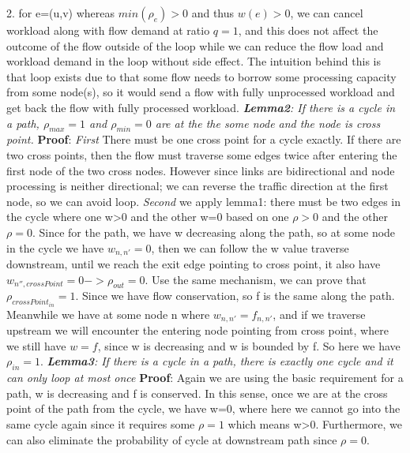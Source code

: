 \documentclass{sig-alternate}
\begin{document}
2. for e=(u,v) whereas $min(\rho_{e})>0$ and thus $w(e) > 0$, we can cancel workload along with flow demand at ratio $q=1$, and this does not affect the outcome of the flow outside of the loop while we can reduce the flow load and workload demand in the loop without side effect. 
\newline
The intuition behind this is that loop exists due to that some flow needs to borrow some processing capacity from some node(s), so it would send a flow with fully unprocessed workload and get back the flow with fully processed workload. 
\newline\newline
\textit{\textbf{Lemma2}: If there is a cycle in a path, $\rho_{max}= 1$ and $\rho_{min} = 0$ are at the the some node and the node is cross point. }
\newline
\textbf{Proof}: 
\newline
\textit{First} There must be one cross point for a cycle exactly. If there are two cross points, then the flow must traverse some edges twice after entering the first node of the two cross nodes. However since links are bidirectional and node processing is neither directional; we can reverse the traffic direction at the first node, so we can avoid loop. 
\newline
\textit{Second} we apply lemma1: there must be two edges in the cycle where one w>0 and the other w=0 based on one $\rho>0$ and the other $\rho=0$. Since for the path, we have w decreasing along the path, so at some node in the cycle we have $w_{n, n'}=0$, then we can follow the w value traverse downstream, until we reach the exit edge pointing to cross point, it also have  $w_{n'',crossPoint}=0->\rho_{out}=0$. \newline
Use the same mechanism, we can prove that $\rho_{crossPoint_{in}}=1$. Since we have flow conservation, so f is the same along the path. Meanwhile we have at some node n where $w_{n,n'} = f_{n, n'}$, and if we traverse upstream we will encounter the entering node pointing from cross point, where we still have $w=f$, since w is decreasing and w is bounded by f. So here we have $\rho_{in}=1$.\newline\newline
\textit{\textbf{Lemma3}: If there is a cycle in a path, there is exactly one cycle and it can only loop at most once }
\newline
\textbf{Proof}: 
\newline
Again we are using the basic requirement for a path, w is decreasing and f is conserved. In this sense, once we are at the cross point of the path from the cycle, we have w=0, where here we cannot go into the same cycle again since it requires some $\rho=1$ which means w>0. Furthermore, we can also eliminate the probability of cycle at downstream path since $\rho=0$. 
\end{document}
